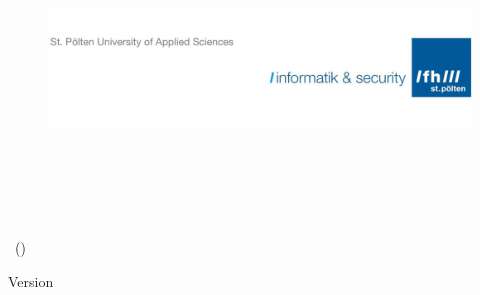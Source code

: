 
\begin{titlepage}

    \begin{figure}[!h]
        \includegraphics[width=\linewidth]{img/fhstp_logo.png}
    \end{figure}

    \vspace{2.5cm}

    {\begin{center} \slabfont\bfseries\huge
            \mytitle\\[5mm]
            \mythema\\
    \end{center}}

    {\begin{flushleft} \sffamily\Large
            \vspace{4cm}
            \mysubject\\
            \mycourse\\[10mm]
            \myauthor~(\myid)\\[10mm]
    \end{flushleft}}

    {\begin{flushleft} \sffamily\normalsize
            \vspace{5cm}
            Version \myversion\\
            \mybegin\\
            \myfinish\\
    \end{flushleft}}

\end{titlepage}

\restoregeometry
